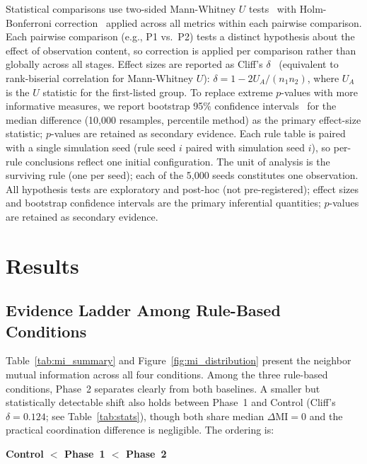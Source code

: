 \documentclass[letterpaper]{article}
\begin{document}
Statistical comparisons use two-sided Mann-Whitney $U$
tests~\citep{mann1947test} with Holm-Bonferroni correction~\citep{holm1979simple}
applied across all metrics within each pairwise comparison. Each pairwise
comparison (e.g., P1 vs.\ P2) tests a distinct hypothesis about the effect of
observation content, so correction is applied per comparison rather than
globally across all stages. Effect sizes are reported as Cliff's
$\delta$~\citep{cliff1993dominance} (equivalent to rank-biserial correlation
for Mann-Whitney $U$):
$\delta = 1 - 2U_A/(n_1 n_2)$, where $U_A$ is the $U$ statistic for
the first-listed group. To replace extreme $p$-values with more informative
measures, we report bootstrap 95\% confidence intervals~\citep{efron1979bootstrap} for
the median difference (10{,}000 resamples, percentile method) as the primary
effect-size
statistic; $p$-values are retained as secondary evidence.
Each rule table is paired with a single simulation
seed (rule seed $i$ paired with simulation seed $i$), so per-rule conclusions
reflect one initial configuration. The unit of analysis is the surviving rule (one per seed); each of the 5{,}000 seeds constitutes one observation. All hypothesis tests are exploratory and post-hoc (not pre-registered); effect sizes and bootstrap confidence intervals are the primary inferential quantities; $p$-values are retained as secondary evidence.

\section{Results}

\subsection{Evidence Ladder Among Rule-Based Conditions}

Table~\ref{tab:mi_summary} and Figure~\ref{fig:mi_distribution} present the
neighbor mutual information across all four conditions. Among the three
rule-based conditions, Phase~2 separates clearly from both baselines.
A smaller but statistically detectable shift also holds between Phase~1 and
Control (Cliff's $\delta = 0.124$; see Table~\ref{tab:stats}), though both
share median $\Delta\mathrm{MI} = 0$ and the practical coordination difference
is negligible.  The ordering is:

\begin{center}
\textbf{Control $<$ Phase~1 $<$ Phase~2}
\end{center}
\end{document}
